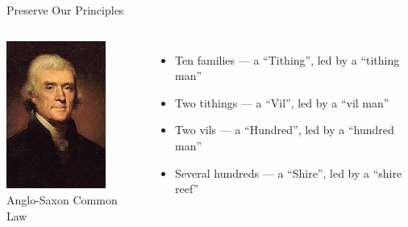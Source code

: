 \documentclass{beamer}
\begin{document}
\begin{frame}{Preserve Our Principles}
    \begin{columns}[onlytextwidth]
            \centering
            \includegraphics[width=0.75\textwidth]{img/jefferson.png} \\
            Anglo-Saxon Common Law \color{red}{Should this be a picture of Hengist and Horsa instead?}\\

            \begin{itemize}
                \item Ten families --- a ``Tithing'', led by a ``tithing man''
                \item Two tithings --- a ``Vil'', led by a ``vil man''
                \item Two vils --- a ``Hundred'', led by a ``hundred man''
                \item Several hundreds --- a ``Shire'', led by a ``shire reef''
            \end{itemize}
    \end{columns}
\end{frame}
\end{document}
